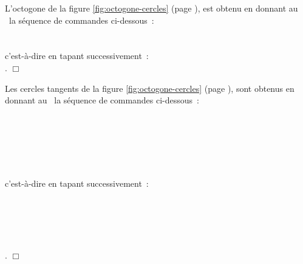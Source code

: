 \begin{corrige}{
L'octogone de la figure \ref{fig:octogone-cercles} (page \pageref{fig:octogone-cercles}), 
est obtenu en donnant au \robot\ la séquence de commandes ci-dessous~:\\
\hspace*{2ex}{\idt av$;$ phtd$;$ av$;$ phtd$;$ av$;$ phtd$;$ av$;$ phtd$;$ av$;$ phtd$;$ av$;$}\\
\hspace*{2ex}{\idt phtd$;$ av$;$ phtd$;$ av$;$ }\\
c'est-à-dire en tapant \hbox{successivement~:}\\
\hspace*{2ex}      
      
  .
$\Box$}\end{corrige}

\begin{corrige}{
Les cercles tangents de la figure \ref{fig:octogone-cercles} (page \pageref{fig:octogone-cercles}), 
sont obtenus en donnant au \robot\ la séquence de commandes \hbox{ci-dessous~:}\\
\hspace*{2ex}{\idt phtd$;$ }\\
\hspace*{2ex}{\idt vd$;$ vd$;$ vd$;$ vd$;$ vd$;$ vd$;$ }\\
\hspace*{2ex}{\idt phtg$;$ }\\
\hspace*{2ex}{\idt vg$;$ vg$;$ vg$;$ vg$;$ vg$;$ vg$;$ }\\
\hspace*{2ex}{\idt phtg$;$ }\\
\hspace*{2ex}{\idt vd$;$ vd$;$ vd$;$ vd$;$ }\\
c'est-à-dire en tapant  \hbox{successivement~:}\\
\hspace*{1ex} \\
\hspace*{1ex}\touche{)} \touche{)} \touche{)} \touche{)} \touche{)} \touche{)} \\
\hspace*{1ex} \\
\hspace*{1ex}\touche{(} \touche{(} \touche{(} \touche{(} \touche{(} \touche{(} \\
\hspace*{1ex} \\
\hspace*{1ex}\touche{)} \touche{)} \touche{)} \touche{)}. 
$\Box$}\end{corrige}

